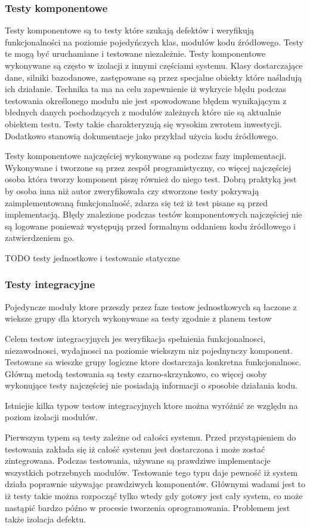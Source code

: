\subsubsection{Testy komponentowe}
Testy komponentowe są to testy które szukają defektów i weryfikują funkcjonalności na poziomie pojedyńczych klas, modułów kodu źródłowego. Testy te mogą być uruchamiane i testowane niezależnie. Testy komponentowe wykonywane są często w izolacji z innymi częściami systemu. Klasy dostarczające dane, silniki bazodanowe, zastępowane są przez specjalne obiekty które naśladują ich działanie. Technika ta ma na celu zapewnienie iż wykrycie błędu podczas testowania określonego modułu nie jest spowodowane błędem wynikającym z błednych danych pochodzących z modułów zależnych które nie są aktualnie obiektem testu. Testy takie charakteryzują się wysokim zwrotem inwestycji. Dodatkowo stanowią dokumentacje jako przykład użycia kodu źródłowego.

Testy komponentowe najczęściej wykonywane są podczas fazy implementacji. Wykonywane i tworzone są przez zespół programistyczny, co więcej najczęściej osoba która tworzy komponent piszę również do niego test. Dobrą praktyką jest by osoba inna niż autor zweryfikowała czy stworzone testy pokrywają zaimplementowaną funkcjonalność, zdarza się też iż test pisane są przed implementacją. Błędy znalezione podczas testów komponentowych najczęściej nie są logowane ponieważ występują przed formalnym oddaniem kodu źródłowego i zatwierdzeniem go.

TODO testy jednostkowe i testowanie statyczne

\subsubsection{Testy integracyjne} 
Pojedyncze moduły ktore przeszly przez faze testow jednostkowych są łaczone z wieksze grupy dla ktorych wykonywane sa testy zgodnie z planem testow

Celem testow integracyjnych jes weryfikacja spełnienia funkcjonalnosci, niezawodnosci, wydajnosci na poziomie wiekszym niz pojednynczy komponent. Testowane sa wieszke grupy logiczne ktore dostarczaja konkretna funkcjonalnosc. Główną metodą testowania są testy czarno-skrzynkowo, co więcej osoby wykonujące testy najczęściej nie posiadają informacji o sposobie działania kodu.

Istniejie kilka typow testow integracyjnych ktore można wyróżnić ze względu na poziom izolacji modułów.

Pierwszym typem są testy zależne od całości systemu. Przed przystąpieniem do testowania zakłada się iż całość systemu jest dostarczona i może zostać zintegrowana.  Podczas testowania, używane są prawdziwe implementacje wszystkich potrzebnych modułów. Testowanie tego typu daje pewność iż system działa poprawnie używając prawdziwych komponentów. Głównymi wadami jest to iż testy takie można rozpocząć tylko wtedy gdy gotowy jest cały system, co może nastąpić bardzo późno w procesie tworzenia oprogramowania. Problemem jest także izolacja defektu.

